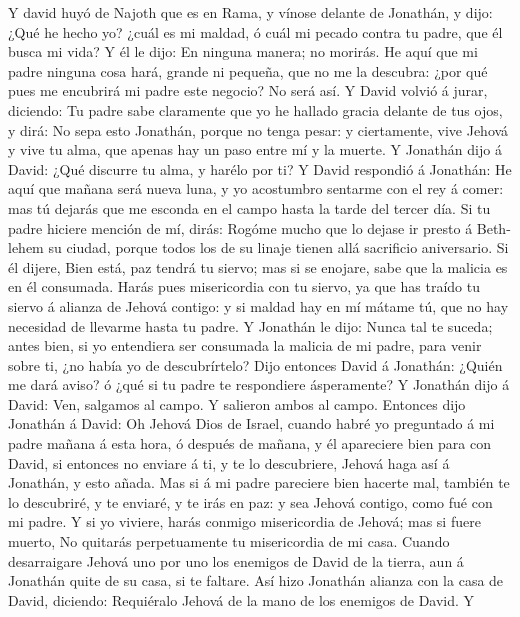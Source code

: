  Y david huyó de Najoth que es en Rama, y vínose delante de
Jonathán, y dijo: ¿Qué he hecho yo? ¿cuál es mi maldad, ó cuál mi pecado
contra tu padre, que él busca mi vida?  Y él le dijo: En
ninguna manera; no morirás. He aquí que mi padre ninguna cosa hará,
grande ni pequeña, que no me la descubra: ¿por qué pues me encubrirá mi
padre este negocio? No será así.  Y David volvió á jurar,
diciendo: Tu padre sabe claramente que yo he hallado gracia delante de
tus ojos, y dirá: No sepa esto Jonathán, porque no tenga pesar: y
ciertamente, vive Jehová y vive tu alma, que apenas hay un paso entre mí
y la muerte.  Y Jonathán dijo á David: ¿Qué discurre tu
alma, y harélo por ti?  Y David respondió á Jonathán: He
aquí que mañana será nueva luna, y yo acostumbro sentarme con el rey á
comer: mas tú dejarás que me esconda en el campo hasta la tarde del
tercer día.  Si tu padre hiciere mención de mí, dirás:
Rogóme mucho que lo dejase ir presto á Beth-lehem su ciudad, porque
todos los de su linaje tienen allá sacrificio aniversario. 
Si él dijere, Bien está, paz tendrá tu siervo; mas si se enojare, sabe
que la malicia es en él consumada.  Harás pues misericordia
con tu siervo, ya que has traído tu siervo á alianza de Jehová contigo:
y si maldad hay en mí mátame tú, que no hay necesidad de llevarme hasta
tu padre.  Y Jonathán le dijo: Nunca tal te suceda; antes
bien, si yo entendiera ser consumada la malicia de mi padre, para venir
sobre ti, ¿no había yo de descubrírtelo?  Dijo entonces
David á Jonathán: ¿Quién me dará aviso? ó ¿qué si tu padre te
respondiere ásperamente?  Y Jonathán dijo á David: Ven,
salgamos al campo. Y salieron ambos al campo.  Entonces
dijo Jonathán á David: Oh Jehová Dios de Israel, cuando habré yo
preguntado á mi padre mañana á esta hora, ó después de mañana, y él
apareciere bien para con David, si entonces no enviare á ti, y te lo
descubriere,  Jehová haga así á Jonathán, y esto añada. Mas
si á mi padre pareciere bien hacerte mal, también te lo descubriré, y te
enviaré, y te irás en paz: y sea Jehová contigo, como fué con mi padre.
 Y si yo viviere, harás conmigo misericordia de Jehová; mas
si fuere muerto,  No quitarás perpetuamente tu misericordia
de mi casa. Cuando desarraigare Jehová uno por uno los enemigos de David
de la tierra, aun á Jonathán quite de su casa, si te faltare.
 Así hizo Jonathán alianza con la casa de David, diciendo:
Requiéralo Jehová de la mano de los enemigos de David.  Y
